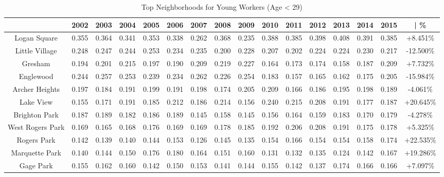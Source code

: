 \documentclass{article}
\theoremstyle{definition}
\theoremstyle{remark}
\begin{document}
\begin{table}[h]\centering
\caption{Top Neighborhoods for Young Workers (Age < 29)}\label{thelabel}
\begin{adjustbox}{center}
\begin{tabular}{||c | c c c c c c c c c c c c c c | c ||} 
 \hline
 & 2002 & 2003 & 2004 & 2005 & 2006 & 2007 & 2008 & 2009 & 2010 & 2011 & 2012 & 2013 & 2014 & 2015 & | \%\\[0.5ex] 
 \hline\hline
Logan Square     & 0.355 & 0.364 & 0.341 & 0.353 & 0.338 & 0.262 & 0.368 & 0.235 & 0.388 & 0.385 & 0.398 & 0.408 & 0.391 & 0.385 & +8.451\% \\
Little Village   & 0.248 & 0.247 & 0.244 & 0.253 & 0.234 & 0.235 & 0.200 & 0.228 & 0.207 & 0.202 & 0.224 & 0.224 & 0.230 & 0.217 & -12.500\% \\
Gresham          & 0.194 & 0.201 & 0.215 & 0.197 & 0.190 & 0.209 & 0.219 & 0.227 & 0.164 & 0.173 & 0.174 & 0.158 & 0.187 & 0.209 & +7.732\% \\
Englewood        & 0.244 & 0.257 & 0.253 & 0.239 & 0.234 & 0.262 & 0.226 & 0.254 & 0.183 & 0.157 & 0.165 & 0.162 & 0.175 & 0.205 & -15.984\% \\
Archer Heights   & 0.197 & 0.184 & 0.191 & 0.199 & 0.191 & 0.198 & 0.174 & 0.205 & 0.209 & 0.166 & 0.186 & 0.195 & 0.198 & 0.189 & -4.061\% \\
Lake View        & 0.155 & 0.171 & 0.191 & 0.185 & 0.212 & 0.186 & 0.214 & 0.156 & 0.240 & 0.215 & 0.208 & 0.191 & 0.177 & 0.187 & +20.645\% \\
Brighton Park    & 0.187 & 0.189 & 0.182 & 0.186 & 0.189 & 0.145 & 0.158 & 0.145 & 0.156 & 0.164 & 0.159 & 0.183 & 0.170 & 0.179 & -4.278\% \\
West Rogers Park & 0.169 & 0.165 & 0.168 & 0.176 & 0.169 & 0.169 & 0.178 & 0.185 & 0.192 & 0.206 & 0.208 & 0.191 & 0.175 & 0.178 & +5.325\% \\
Rogers Park      & 0.142 & 0.139 & 0.140 & 0.144 & 0.153 & 0.126 & 0.145 & 0.135 & 0.154 & 0.166 & 0.154 & 0.154 & 0.158 & 0.174 & +22.535\% \\
Marquette Park   & 0.140 & 0.144 & 0.150 & 0.176 & 0.180 & 0.164 & 0.151 & 0.160 & 0.131 & 0.132 & 0.135 & 0.124 & 0.142 & 0.167 & +19.286\% \\
Gage Park        & 0.155 & 0.162 & 0.160 & 0.142 & 0.150 & 0.153 & 0.141 & 0.144 & 0.155 & 0.142 & 0.137 & 0.174 & 0.166 & 0.166 & +7.097\% \\
 \hline
 \end{tabular}

\end{adjustbox}
 \end{table}
 
\end{document}
